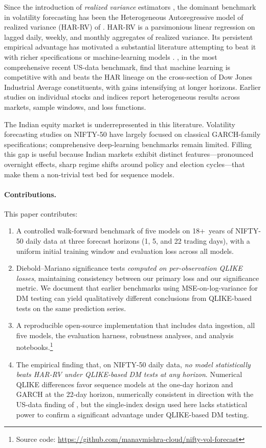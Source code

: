 \documentclass[11pt]{article}
\begin{document}
Since the introduction of \emph{realized variance} estimators
\citep{andersen2003modeling}, the dominant benchmark in volatility
forecasting has been the Heterogeneous Autoregressive model of
realized variance (HAR-RV) of \citet{corsi2009}. HAR-RV is a
parsimonious linear regression on lagged daily, weekly, and monthly
aggregates of realized variance. Its persistent empirical advantage
has motivated a substantial literature attempting to beat it with
richer specifications or machine-learning models
\citep{audrino2020machine, christensen2023machine}.
\citet{christensen2023machine}, in the most comprehensive recent
US-data benchmark, find that machine learning is competitive with
and beats the HAR lineage on the cross-section of Dow Jones
Industrial Average constituents, with gains intensifying at
longer horizons. Earlier studies on individual stocks and
indices report heterogeneous results across markets, sample
windows, and loss functions.

The Indian equity market is underrepresented in this literature.
Volatility forecasting studies on NIFTY-50 have largely focused on
classical GARCH-family specifications; comprehensive deep-learning
benchmarks remain limited. Filling this gap is useful because Indian
markets exhibit distinct features---pronounced overnight effects,
sharp regime shifts around policy and election cycles---that make
them a non-trivial test bed for sequence models.

\paragraph{Contributions.} This paper contributes:

\begin{enumerate}
  \item A controlled walk-forward benchmark of five models on
  18+~years of NIFTY-50 daily data at three forecast horizons
  (1, 5, and 22 trading days), with a uniform initial training
  window and evaluation loss across all models.
  \item Diebold--Mariano significance tests \emph{computed on
  per-observation QLIKE losses}, maintaining consistency between
  our primary loss and our significance metric. We document that
  earlier benchmarks using MSE-on-log-variance for DM testing can
  yield qualitatively different conclusions from QLIKE-based tests
  on the same prediction series.
  \item A reproducible open-source implementation that includes data
  ingestion, all five models, the evaluation harness, robustness
  analyses, and analysis notebooks.\footnote{Source code:
  \url{https://github.com/manavmishra-cloud/nifty-vol-forecast}}
  \item The empirical finding that, on NIFTY-50 daily data,
  \emph{no model statistically beats HAR-RV under QLIKE-based DM
  tests at any horizon}. Numerical QLIKE differences favor sequence
  models at the one-day horizon and GARCH at the 22-day horizon,
  numerically consistent in direction with the US-data finding of
  \citet{christensen2023machine}, but the single-index design
  used here lacks statistical power to confirm a significant
  advantage under QLIKE-based DM testing.
\end{enumerate}
\end{document}

